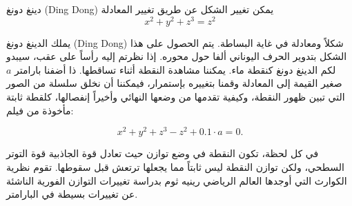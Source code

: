 \begin{surferPage}{دينغ دونغ \textenglish{(Ding Dong)}}
يمكن تغيير الشكل عن طريق تغيير المعادلة\\

\smallskip
\[x^2	+ y^2	+ z^3	= z^2\]

\singlespacing
يملك الدينغ دونغ
\textenglish{ (Ding Dong)} شكلاً ومعادلة في غاية البساطة.  يتم الحصول على هذا الشكل بتدوير الحرف اليوناني ألفا حول محوره. إذا نظرتم إليه رأساً على عقب، سيبدو لكم الدينغ دونغ كنقطة ماء. يمكننا مشاهدة النقطة أثناء تساقطها.
\newline
ذا أضفنا بارامتر  $a$  صغير القيمة إلى المعادلة وقمنا بتغييره بإستمرار، فيمكننا أن نخلق سلسلة من الصور التي تبين ظهور النقطة، وكيفية تقدمها من وضعها النهائي وأخيراً إنفصالها، كلقطة ثابتة مأخوذة من فيلم: 


\[x^2	+ y^2	+ z^3	-z^2+0.1\cdot a=0.\]

في كل لحظة، تكون النقطة في وضع توازن حيث تعادل قوة الجاذبية قوة التوتر السطحي، ولكن توازن النقطة ليس ثابتاً مما يجعلها ترتعش قبل سقوطها. تقوم نظرية الكوارث التي أوجدها العالم الرياضي رينيه ثوم بدراسة تغييرات التوازن الفورية الناشئة عن تغييرات بسيطة في البارامتر.
\end{surferPage} 